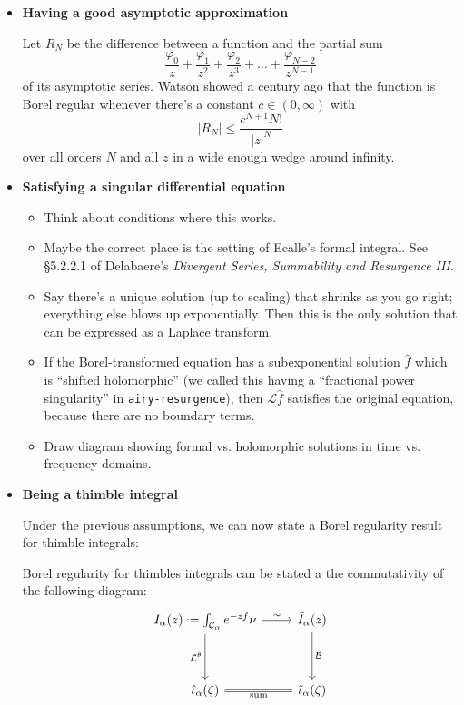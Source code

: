 \documentclass[11pt,a4paper,twoside,leqno,noamsfonts]{amsart}
\numberwithin{equation}{section}
\newcommand{\laplace}{\mathcal{L}}
\begin{document}
\begin{itemize}
\item \textbf{Having a good asymptotic approximation}

Let $R_N$ be the difference between a function and the partial sum
\[ \frac{\varphi_0}{z} + \frac{\varphi_1}{z^2} + \frac{\varphi_2}{z^3} + \ldots + \frac{\varphi_{N-2}}{z^{N-1}} \]
of its asymptotic series. Watson showed a century ago that the function is Borel regular whenever there's a constant $c \in (0, \infty)$ with
\[ |R_N| \le \frac{c^{N+1} N!}{|z|^N} \]
over all orders $N$ and all $z$ in a wide enough wedge around infinity.
\item \textbf{Satisfying a singular differential equation}

\begin{itemize}
\item Think about conditions where this works.
\item Maybe the correct place is the setting of Ecalle's formal integral. See \S 5.2.2.1 of Delabaere's {\em Divergent Series, Summability and Resurgence III}.
\item Say there's a unique solution (up to scaling) that shrinks as you go right; everything else blows up exponentially. Then this is the only solution that can be expressed as a Laplace transform.
\item If the Borel-transformed equation has a subexponential solution $\hat{f}$ which is ``shifted holomorphic'' (we called this having a ``fractional power singularity'' in {\tt airy-resurgence}), then $\laplace \hat{f}$ satisfies the original equation, because there are no boundary terms.
\item Draw diagram showing formal vs. holomorphic solutions in time vs. frequency domains.
\end{itemize}
\item \textbf{Being a thimble integral}

Under the previous assumptions, we can now state a Borel regularity result for thimble integrals: 
 
\begin{theorem}\label{thm:borel integrals}
Borel regularity for thimbles integrals can be stated a the commutativity of the following diagram:
\begin{equation}
\begin{tikzcd}
I_{\alpha}(z)\defeq\int_{\mathcal{C}_\alpha}e^{-zf}\nu \arrow[r,"\sim"]\arrow[dd, swap, "\mathcal{L}^\theta "] & \tilde{I}_{\alpha}(z)\arrow[dd,"\mathcal{B}"]\\
& \\
\hat{\iota}_\alpha(\zeta)\arrow[r,equal,swap, "\text{sum}"] & \tilde{\iota}_{\alpha}(\zeta) 
\end{tikzcd}
\end{equation}
\end{theorem}


\end{itemize}
\end{document}
